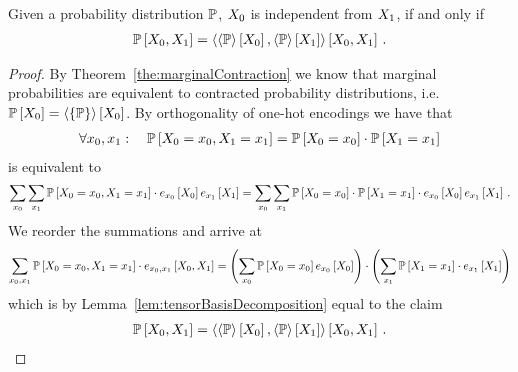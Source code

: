 \begin{theorem}\label{the:independenceProductCriterion}
	Given a probability distribution $\mathbb{P}$, $X_{0}$ is independent from $X_{1}$, if and only if 
	\begin{align*}
		\mathbb{P}\left[X_{0},X_{1}\right] 
		= \left\langle \left\langle \mathbb{P}\right\rangle \left[ X_{0} \right],\left\langle \mathbb{P}\right\rangle \left[ X_{1} \right]\right\rangle \left[ X_{0},X_{1} \right] \, . 
	\end{align*}
\end{theorem}
\begin{proof}
	By Theorem~\ref{the:marginalContraction} we know that marginal probabilities are equivalent to contracted probability distributions, i.e. $\mathbb{P}\left[X_{0}\right] = \left\langle \{\mathbb{P}\}\right\rangle \left[ X_{0} \right] $.
	By orthogonality of one-hot encodings we have that
	\begin{align*}
		\forall x_{0}, x_{1} : \quad  \mathbb{P}\left[X_{0}=x_{0},X_{1}=x_{1}\right] 
		= \mathbb{P}\left[X_{0}=x_{0}\right]
		 \cdot 
		 \mathbb{P}\left[X_{1}=x_{1}\right] 
	\end{align*}
	is equivalent to 
	\begin{align*}
		\sum_{x_{0}}\sum_{x_{1}} \mathbb{P}\left[X_{0}=x_{0},X_{1}=x_{1}\right] \cdot e_{x_{0}}\left[X_{0}\right]e_{x_{1}}\left[X_{1}\right]
		= \sum_{x_{0}}\sum_{x_{1}} 
		\mathbb{P}\left[X_{0}=x_{0}\right]
		 \cdot 
		 \mathbb{P}\left[X_{1}=x_{1}\right] \cdot e_{x_{0}}\left[X_{0}\right]e_{x_{1}}\left[X_{1}\right] \, .
	\end{align*}
	We reorder the summations and arrive at
	\begin{align*}
		\sum_{x_{0},x_{1}} 
		\mathbb{P}\left[X_{0}=x_{0},X_{1}=x_{1}\right] \cdot e_{x_{0},x_{1}}\left[X_{0}, X_{1}\right]
		= \left(\sum_{x_{0}}\mathbb{P}\left[X_{0}=x_{0}\right] e_{x_{0}}\left[X_{0}\right] \right)
		\cdot 
		\left( \sum_{x_{1}}  \mathbb{P}\left[X_{1}=x_{1}\right] \cdot e_{x_{1}}\left[X_{1}\right]  \right) 
	\end{align*}
	which is by Lemma~\ref{lem:tensorBasisDecomposition} equal to the claim
	\begin{align*}
		\mathbb{P}\left[X_{0},X_{1}\right] = \left\langle \left\langle \mathbb{P}\right\rangle \left[ X_{0} \right],\left\langle \mathbb{P}\right\rangle \left[ X_{1} \right]\right\rangle \left[ X_{0},X_{1} \right] \, . 
	\end{align*}
\end{proof}


